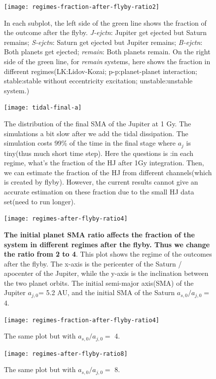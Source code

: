 \documentclass[fleqn,usenatbib,useAMS]{mnras}
\begin{document}
\begin{figure}
	\texttt{[image: regimes-fraction-after-flyby-ratio2]}
	\caption{In each subplot, the {\color{green}left side} of the green line shows the fraction of the outcome after the flyby. \textit{J-ejctn}: Jupiter get ejected but Saturn remains; \textit{S-ejctn}: Saturn get ejected but Jupiter remains; \textit{B-ejctn}: Both planets get ejected; \textit{remain}: Both planets remain. On the {\color{green}right side} of the green line, for \textit{remain} systems, here shows the fraction in different regimes(LK:Lidov-Kozai; p-p:planet-planet interaction; stable:stable without eccentricity excitation; unstable:unstable system.) }
	\label{fig:schematics}
\end{figure}

\begin{figure}
	\texttt{[image: tidal-final-a]}
	\caption{The distribution of the final SMA of the Jupiter at 1 Gy. The simulations a bit slow after we add the tidal dissipation. The simulation costs 99\% of the time in the final stage where $a_j$ is tiny(thus much short time step). Here the questions is :in each regime, what's the fraction of the HJ after 1Gy integration. Then, we can estimate the fraction of the HJ from different channels(which is created by flyby). However, the current results cannot give an accurate estimation on these fraction due to the small HJ data set(need to run longer). }
	\label{fig:schematics}
\end{figure}


\begin{figure}
	\texttt{[image: regimes-after-flyby-ratio4]}
	\caption{\textbf{The initial planet SMA ratio affects the fraction of the system in different regimes after the flyby. Thus we change the ratio from 2 to 4}. This plot shows the regime of the outcomes after the flyby. The x-axis is the pericenter of the Saturn / apocenter of the Jupiter, while the y-axis is the inclination between the two planet orbits. The initial semi-major axis(SMA) of the Jupiter $a_{j,0}$= 5.2 AU, and the initial SMA of the Saturn $a_{s,0}/a_{j,0}=${\color{red} 4}. }
	\label{fig:schematics}
\end{figure}

\begin{figure}
	\texttt{[image: regimes-fraction-after-flyby-ratio4]}
	\caption{The same plot but with $a_{s,0}/a_{j,0}=${\color{red} 4}.}
	\label{fig:schematics}
\end{figure}


\begin{figure}
	\texttt{[image: regimes-after-flyby-ratio8]}
	\caption{The same plot but with $a_{s,0}/a_{j,0}=${\color{red} 8}.}
	\label{fig:schematics}
\end{figure}
\end{document}
